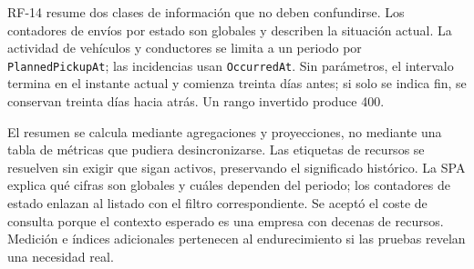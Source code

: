 RF-14 resume dos clases de información que no deben confundirse. Los contadores de envíos por estado son globales y describen la situación actual. La actividad de vehículos y conductores se limita a un periodo por \texttt{PlannedPickupAt}; las incidencias usan \texttt{OccurredAt}. Sin parámetros, el intervalo termina en el instante actual y comienza treinta días antes; si solo se indica fin, se conservan treinta días hacia atrás. Un rango invertido produce 400.

El resumen se calcula mediante agregaciones y proyecciones, no mediante una tabla de métricas que pudiera desincronizarse. Las etiquetas de recursos se resuelven sin exigir que sigan activos, preservando el significado histórico. La SPA explica qué cifras son globales y cuáles dependen del periodo; los contadores de estado enlazan al listado con el filtro correspondiente. Se aceptó el coste de consulta porque el contexto esperado es una empresa con decenas de recursos. Medición e índices adicionales pertenecen al endurecimiento si las pruebas revelan una necesidad real.

